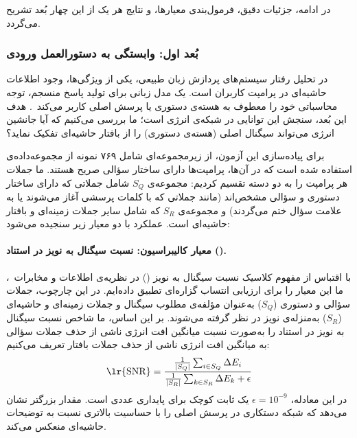 \vspace{0.5cm}
در ادامه، جزئیات دقیق، فرمول‌بندی معیارها، و نتایج هر یک از این چهار بُعد تشریح می‌گردد.


\subsubsection{بُعد اول: وابستگی به دستورالعمل ورودی}\label{sec:5-2-2-1}

در تحلیل رفتار سیستم‌های پردازش زبان طبیعی، یکی از ویژگی‌ها، وجود اطلاعات حاشیه‌ای در پرامپت کاربران است. یک مدل زبانی برای تولید پاسخ منسجم، توجه محاسباتی خود را معطوف به هسته‌ی دستوری یا پرسش اصلی کاربر می‌کند~\cite{deyoung2020eraser}. هدف این بُعد، سنجش این توانایی در شبکه‌ی انرژی است؛ ما بررسی می‌کنیم که آیا جانشین انرژی می‌تواند سیگنال اصلی (هسته‌ی دستوری) را از بافتار حاشیه‌ای تفکیک نماید؟

برای پیاده‌سازی این آزمون، از زیرمجموعه‌ای شامل ۷۶۹ نمونه از مجموعه‌داده‌ی  استفاده شده است که در آن‌ها، پرامپت‌ها دارای ساختار سؤالی صریح هستند. ما جملات هر پرامپت را به دو دسته تقسیم کردیم: مجموعه‌ی $S_Q$ شامل جملاتی که دارای ساختار دستوری و سؤالی مشخص‌اند (مانند جملاتی که با کلمات پرسشی آغاز می‌شوند یا به علامت سؤال ختم می‌گردند) و مجموعه‌ی $S_R$ که شامل سایر جملات زمینه‌ای و بافتار حاشیه‌ای است. عملکرد با دو معیار زیر سنجیده می‌شود:

\paragraph{معیار کالیبراسیون: نسبت سیگنال به نویز در استناد ().}
با اقتباس از مفهوم کلاسیک نسبت سیگنال به نویز () در نظریه‌ی اطلاعات و مخابرات~\cite{shannon1948mathematical}، ما این معیار را برای ارزیابی انتساب گزاره‌ای تطبیق داده‌ایم. در این چارچوب، جملات سؤالی و دستوری ($S_Q$) به‌عنوان مؤلفه‌ی مطلوب سیگنال و جملات زمینه‌ای و حاشیه‌ای ($S_R$) به‌منزله‌ی نویز در نظر گرفته می‌شوند. بر این اساس، ما شاخص نسبت سیگنال به نویز در استناد را به‌صورت نسبت میانگین افت انرژی ناشی از حذف جملات سؤالی به میانگین افت انرژی ناشی از حذف جملات بافتار تعریف می‌کنیم:
\begin{equation}
    \text{\lr{SNR}} = \frac{\frac{1}{|S_Q|} \sum_{i \in S_Q} \Delta E_i}{\frac{1}{|S_R|} \sum_{k \in S_R} \Delta E_k + \epsilon} \label{eq:chap5_snr}
\end{equation}
در این معادله، $\epsilon = 10^{-9}$ یک ثابت کوچک برای پایداری عددی است. مقدار بزرگتر  نشان می‌دهد که شبکه دستکاری در پرسش اصلی را با حساسیت بالاتری نسبت به توضیحات حاشیه‌ای منعکس می‌کند.

